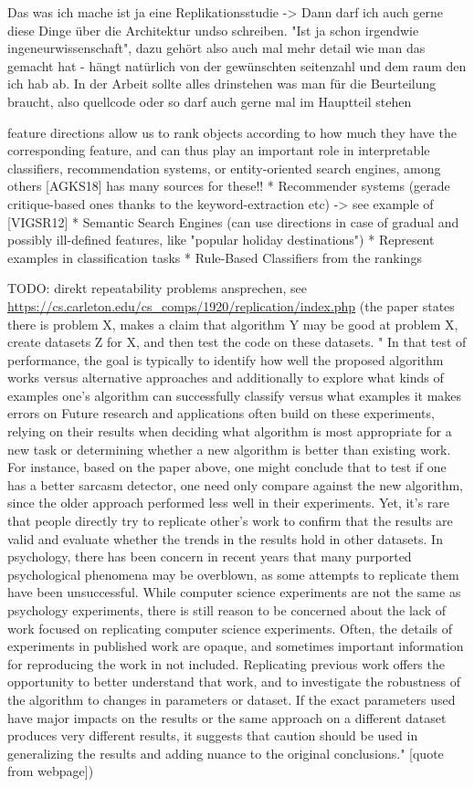 Das was ich mache ist ja eine Replikationsstudie -> Dann darf ich auch gerne diese Dinge über die Architektur undso schreiben. "Ist ja schon irgendwie ingeneurwissenschaft", dazu gehört also auch mal mehr detail wie man das gemacht hat - hängt natürlich von der gewünschten seitenzahl und dem raum den ich hab ab. In der Arbeit sollte alles drinstehen was man für die Beurteilung braucht, also quellcode oder so darf auch gerne mal im Hauptteil stehen

feature directions allow us to rank objects according to how much they have the corresponding feature, and can thus play an important role in interpretable classifiers, recommendation systems, or entity-oriented search engines, among others  [AGKS18] has many sources for these!!
	* Recommender systems (gerade critique-based ones thanks to the keyword-extraction etc)
		-> see example of [VIGSR12]
	* Semantic Search Engines (can use directions in case of gradual and possibly ill-defined features, like "popular holiday destinations")
	* Represent examples in classification tasks
	* Rule-Based Classifiers from the rankings

TODO: direkt repeatability problems ansprechen, see \url{https://cs.carleton.edu/cs_comps/1920/replication/index.php} (the paper states there is problem X, makes a claim that algorithm Y may be good at problem X, create datasets Z for X, and then test the code on these datasets. " In that test of performance, the goal is typically to identify how well the proposed algorithm works versus alternative approaches and additionally to explore what kinds of examples one's algorithm can successfully classify versus what examples it makes errors on  Future research and applications often build on these experiments, relying on their results when deciding what algorithm is most appropriate for a new task or determining whether a new algorithm is better than existing work. For instance, based on the paper above, one might conclude that to test if one has a better sarcasm detector, one need only compare against the new algorithm, since the older approach performed less well in their experiments. Yet, it's rare that people directly try to replicate other's work to confirm that the results are valid and evaluate whether the trends in the results hold in other datasets. In psychology, there has been concern in recent years that many purported psychological phenomena may be overblown, as some attempts to replicate them have been unsuccessful. While computer science experiments are not the same as psychology experiments, there is still reason to be concerned about the lack of work focused on replicating computer science experiments. Often, the details of experiments in published work are opaque, and sometimes important information for reproducing the work in not included. Replicating previous work offers the opportunity to better understand that work, and to investigate the robustness of the algorithm to changes in parameters or dataset. If the exact parameters used have major impacts on the results or the same approach on a different dataset produces very different results, it suggests that caution should be used in generalizing the results and adding nuance to the original conclusions." [quote from webpage])


